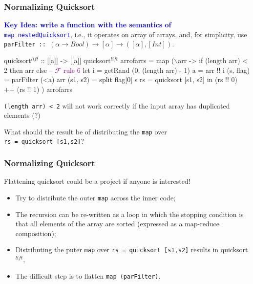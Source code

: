 \documentclass{beamer}
\newcommand{\blue}[1]{\textcolor{Blue}{{#1}}}
\newcommand{\purple}[1]{\textcolor{Purple}{{#1}}}
\newcommand{\emp}[1]{\textcolor{DikuRed}{ #1}}
\newcommand{\emphh}[1]{\textcolor{CosGreen}{ #1}}
\newcommand{\mymath}[1]{$ #1 $}
\newcommand{\myindu}[1]{^{#1}}
\begin{document}
\begin{frame}[fragile,t]
  \frametitle{Normalizing Quicksort}

\blue{\bf Key Idea: write a function with the semantics of}\\
\blue{\tt map nestedQuicksort}, i.e., it operates on array of arrays,
 and, for simplicity, use
{\tt parFilter :: $(\alpha\rightarrow Bool)\rightarrow[\alpha]\rightarrow([\alpha],[Int])$}.

\bigskip

\begin{colorcode}[fontsize=\scriptsize]
quicksort\mymath{\myindu{lift}} :: [[a]] -> [[a]]
quicksort\mymath{\myindu{lift}} arrofarrs = 
  map (\mymath{\backslash}arr ->
          if  \alert{(length arr) < 2} then arr else \purple{-- \mymath{\mathcal{F}} rule 6}
          let i  = getRand (0, (length arr) - 1)
              a  = arr !! i
              (s, flag) = \emp{parFilter} (<a) arr
              (s1, s2)  = split flag[0] s
              \alert{rs = quicksort [s1, s2]}
          in  (rs !! 0) ++ (rs !! 1)
      ) arrofarrs
\end{colorcode}

\alert{\tt (length arr) < 2} will not work correctly if the input array has duplicated elements (?)
\medskip

What should the result be of distributing the \alert{\tt map} over\\ \alert{\tt rs = quicksort [s1,s2]}?
\medskip


\end{frame}

\begin{frame}[fragile,t]
  \frametitle{Normalizing Quicksort}

\alert{Flattening quicksort could be a project if anyone is interested!}
\bigskip

\begin{itemize}
    \item Try to distribute the outer {\tt map} across the inner code;\medskip
    \item The recursion can be re-written as a loop in which the stopping 
            condition is that all elements of the array are sorted 
            (expressed as a map-reduce composition);\medskip
    \item Distributing the puter \alert{\tt map} over \alert{\tt rs = quicksort [s1,s2]}
            results in \emphh{quicksort\mymath{\myindu{lift}}},
    \item \alert{The difficult step} is to flatten {\tt map (parFilter)}.
\end{itemize}

\end{frame}







\end{document}
